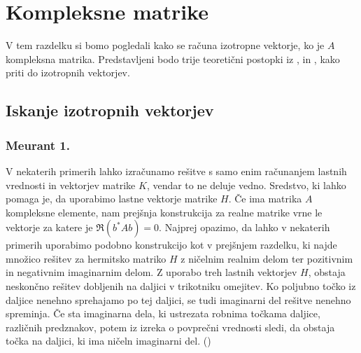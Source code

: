 \documentclass[12pt,a4paper]{amsart}
\theoremstyle{definition}
\newtheorem{opomba}[definicija]{Opomba}
\theoremstyle{plain}
\begin{document}
\section{Kompleksne matrike}
V tem razdelku si bomo pogledali kako se računa izotropne vektorje, ko je $A$ kompleksna matrika. Predstavljeni bodo trije teoretični postopki iz \cite{meurant},\cite{carden} in \cite{trije}, kako priti do izotropnih vektorjev.
\subsection{Iskanje izotropnih vektorjev}
\subsubsection{Meurant 1.}
V nekaterih primerih lahko izračunamo rešitve s samo enim ra\-ču\-na\-njem lastnih vrednosti in vektorjev matrike $K$, vendar to ne deluje vedno. Sredstvo, ki lahko pomaga je, da uporabimo lastne vektorje matrike $H$. 
Če ima matrika $A$ kompleksne elemente, nam prejšnja konstrukcija za realne matrike vrne le vektorje za katere je $\Re(b^\ast Ab)=0$. 
Najprej opazimo, da lahko v nekaterih primerih uporabimo podobno konstrukcijo kot v prejšnjem razdelku, ki najde množico rešitev za hermitsko matriko $H$ z ničelnim realnim delom ter pozitivnim in negativnim imaginarnim delom. 
Z uporabo treh lastnih vektorjev $H$, obstaja neskončno rešitev dobljenih na daljici v trikotniku omejitev. 
Ko poljubno točko iz daljice nenehno sprehajamo po tej daljici, se tudi imaginarni del rešitve nenehno spreminja. 
Če sta imaginarna dela, ki ustrezata robnima točkama daljice, različnih predznakov, potem iz izreka o povprečni vrednosti sledi, da obstaja točka na daljici, ki ima ničeln imaginarni del. (\cite{meurant}) \\
\end{document}

